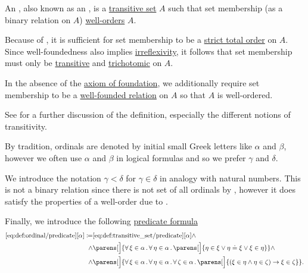 \begin{definition}\label{def:ordinal}
  An , also known as an , is a \hyperref[def:transitive_set]{transitive set} \( A \) such that set membership (as a binary relation on \( A \)) \hyperref[def:well_ordered_set]{well-orders} \( A \).

  Because of , it is sufficient for set membership to be a \hyperref[def:totally_ordered_set]{strict total order} on \( A \). Since well-foundedness also implies \hyperref[def:binary_relation/irreflexive]{irreflexivity}, it follows that set membership must only be \hyperref[def:binary_relation/transitive]{transitive} and \hyperref[def:binary_relation/trichotomic]{trichotomic} on \( A \).

  In the absence of the \hyperref[def:zfc/foundation]{axiom of foundation}, we additionally require set membership to be a \hyperref[def:well_founded_relation]{well-founded relation} on \( A \) so that \( A \) is well-ordered.

  See  for a further discussion of the definition, especially the different notions of transitivity.

  By tradition, ordinals are denoted by initial small Greek letters like \( \alpha \) and \( \beta \), however we often use \( \alpha \) and \( \beta \) in logical formulas and so we prefer \( \gamma \) and \( \delta \).

  We introduce the notation \( \gamma < \delta \) for \( \gamma \in \delta \) in analogy with natural numbers. This is not a binary relation since there is not set of all ordinals by , however it does satisfy the properties of a well-order due to .

  Finally, we introduce the following \hyperref[rem:predicate_formula]{predicate formula}
  \begin{equation*}\taglabel[\op{IsOrdinal}]{eq:def:ordinal/predicate}
    \begin{aligned}
      \ref{eq:def:ordinal/predicate}[\alpha] \coloneqq
        &\ref{eq:def:transitive_set/predicate}[\alpha]
        \wedge \\ \wedge&
        \parens[\Big]
        {
          \qforall {\xi \in \alpha}
          \qforall {\eta \in \alpha}
          \parens[\Big]
            {
              \eta \in \xi \vee \eta \doteq \xi \vee \xi \in \eta
            }
        }
        \wedge \\ \wedge&
        \parens[\Big]
        {
          \qforall {\xi \in \alpha}
          \qforall {\eta \in \alpha}
          \qforall {\zeta \in \alpha}
          \parens[\Big]
          {
            (\xi \in \eta \wedge \eta \in \zeta) \rightarrow \xi \in \zeta
          }
        }.
    \end{aligned}
  \end{equation*}
\end{definition}

